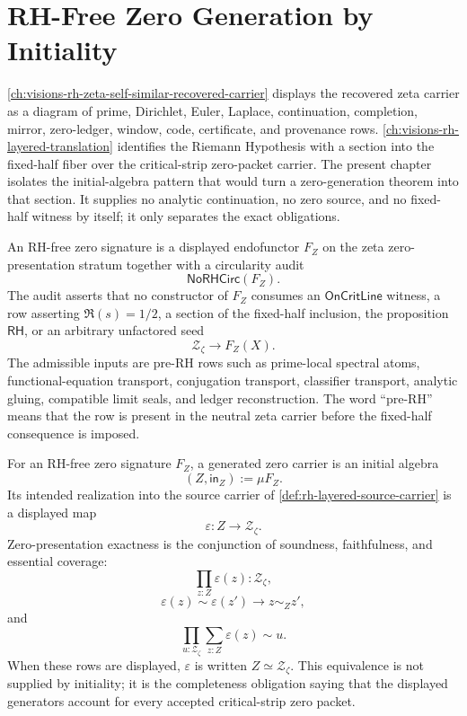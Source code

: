 \chapter{RH-Free Zero Generation by Initiality}
\label{ch:visions-rh-free-zero-generation-initiality}

\autoref{ch:visions-rh-zeta-self-similar-recovered-carrier} displays the
recovered zeta carrier as a diagram of prime, Dirichlet, Euler, Laplace,
continuation, completion, mirror, zero-ledger, window, code, certificate,
and provenance rows. \autoref{ch:visions-rh-layered-translation} identifies
the Riemann Hypothesis with a section into the fixed-half fiber over the
critical-strip zero-packet carrier. The present chapter isolates the
initial-algebra pattern that would turn a zero-generation theorem into that
section. It supplies no analytic continuation, no zero source, and no
fixed-half witness by itself; it only separates the exact obligations.

\begin{definition}
\label{def:rh-free-zero-signature}
An RH-free zero signature is a displayed endofunctor $F_Z$ on the zeta
zero-presentation stratum together with a circularity audit
$$
\mathsf{NoRHCirc}(F_Z).
$$
The audit asserts that no constructor of $F_Z$ consumes an
$\mathsf{OnCritLine}$ witness, a row asserting $\Re(s)=1/2$, a section of
the fixed-half inclusion, the proposition $\mathsf{RH}$, or an arbitrary
unfactored seed
$$
\mathcal Z_{\zeta}\to F_Z(X).
$$
The admissible inputs are pre-RH rows such as prime-local spectral atoms,
functional-equation transport, conjugation transport, classifier transport,
analytic gluing, compatible limit seals, and ledger reconstruction. The
word ``pre-RH'' means that the row is present in the neutral zeta carrier
before the fixed-half consequence is imposed.
\end{definition}

\begin{definition}
\label{def:rh-generated-zero-carrier}
For an RH-free zero signature $F_Z$, a generated zero carrier is an initial
algebra
$$
(Z,\mathsf{in}_{Z}) := \mu F_Z.
$$
Its intended realization into the source carrier of
\autoref{def:rh-layered-source-carrier} is a displayed map
$$
\varepsilon:Z\to\mathcal Z_{\zeta}.
$$
Zero-presentation exactness is the conjunction of soundness, faithfulness,
and essential coverage:
$$
\prod_{z:Z}\varepsilon(z):\mathcal Z_{\zeta},
$$
$$
\varepsilon(z)\sim\varepsilon(z')\to z\sim_Z z',
$$
and
$$
\prod_{u:\mathcal Z_{\zeta}}
\sum_{z:Z}\varepsilon(z)\sim u.
$$
When these rows are displayed, $\varepsilon$ is written
$Z\simeq\mathcal Z_{\zeta}$. This equivalence is not supplied by
initiality; it is the completeness obligation saying that the displayed
generators account for every accepted critical-strip zero packet.
\end{definition}

